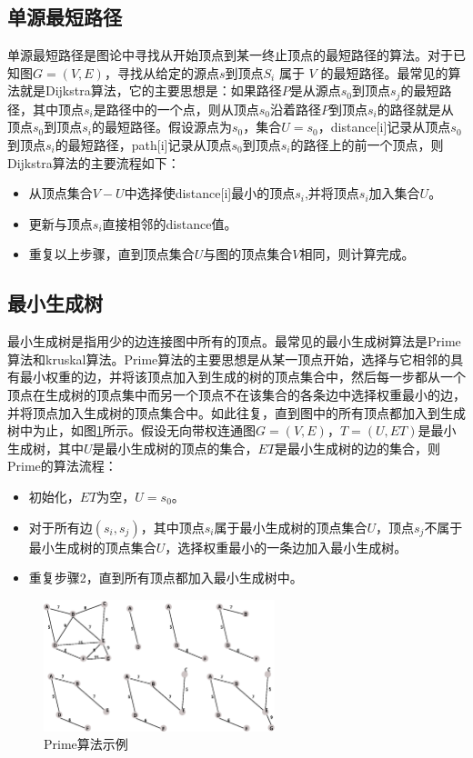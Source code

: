 \subsection{单源最短路径}
单源最短路径是图论中寻找从开始顶点到某一终止顶点的最短路径的算法。对于已知图$G=(V,E)$，寻找从给定的源点$s$到顶点$S_i$ 属于 $V$ 的最短路径。最常见的算法就是Dijkstra算法，它的主要思想是：如果路径$P$是从源点$s_0$到顶点$s_j$的最短路径，其中顶点$s_i$是路径中的一个点，则从顶点$s_0$沿着路径$P$到顶点$s_i$的路径就是从顶点$s_0$到顶点$s_i$的最短路径。假设源点为$s_0$，集合$U={s_0}$，distance[i]记录从顶点$s_0$到顶点$s_i$的最短路径，path[i]记录从顶点$s_0$到顶点$s_i$的路径上的前一个顶点，则Dijkstra算法的主要流程如下：

\begin{itemize}
\item 从顶点集合$V-U$中选择使distance[i]最小的顶点$s_i$,并将顶点$s_i$加入集合$U$。
\item 更新与顶点$s_i$直接相邻的distance值。
\item 重复以上步骤，直到顶点集合$U$与图的顶点集合$V$相同，则计算完成。
\end{itemize}


\subsection{最小生成树}
最小生成树是指用少的边连接图中所有的顶点。最常见的最小生成树算法是Prime算法和kruskal算法。Prime算法的主要思想是从某一顶点开始，选择与它相邻的具有最小权重的边，并将该顶点加入到生成的树的顶点集合中，然后每一步都从一个顶点在生成树的顶点集中而另一个顶点不在该集合的各条边中选择权重最小的边，并将顶点加入生成树的顶点集合中。如此往复，直到图中的所有顶点都加入到生成树中为止，如图\ref{fig:prime}所示。假设无向带权连通图$G=(V,E)$，$T=(U,ET)$是最小生成树，其中$U$是最小生成树的顶点的集合，$ET$是最小生成树的边的集合，则Prime的算法流程：

\begin{itemize}
\item 初始化，$ET$为空，$U={s_0}$。
\item 对于所有边$(s_i,s_j)$，其中顶点$s_i$属于最小生成树的顶点集合$U$，顶点$s_j$不属于最小生成树的顶点集合$U$，选择权重最小的一条边加入最小生成树。
\item 重复步骤2，直到所有顶点都加入最小生成树中。
\end{itemize}


\begin{figure}[htbp]
\centering
\includegraphics[width=0.6\textwidth]{myfigures/prime}
\caption{Prime算法示例}\label{fig:prime}
\end{figure}

